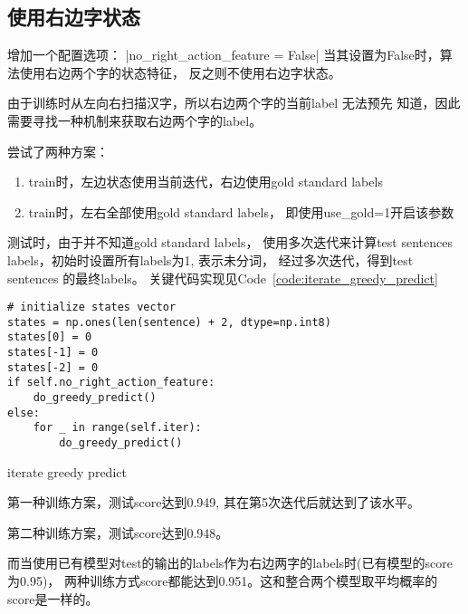 \documentclass[]{article}
\begin{document}
\pagebreak

\subsection{使用右边字状态}

增加一个配置选项：
|no_right_action_feature = False|
当其设置为False时，算法使用右边两个字的状态特征，
反之则不使用右边字状态。

由于训练时从左向右扫描汉字，所以右边两个字的当前label 无法预先
知道，因此需要寻找一种机制来获取右边两个字的label。

尝试了两种方案：
\begin{enumerate}
	\item train时，左边状态使用当前迭代，右边使用gold standard labels
	\item train时，左右全部使用gold standard labels，
	    即使用use\_gold=1开启该参数
\end{enumerate}

测试时，由于并不知道gold standard labels，
使用多次迭代来计算test sentences labels，初始时设置所有labels为1, 表示未分词，
经过多次迭代，得到test sentences 的最终labels。
关键代码实现见Code~\ref{code:iterate_greedy_predict}

\begin{listing}[H]
\begin{verbatim}
# initialize states vector
states = np.ones(len(sentence) + 2, dtype=np.int8)
states[0] = 0
states[-1] = 0
states[-2] = 0
if self.no_right_action_feature:
    do_greedy_predict()
else:
    for _ in range(self.iter):
        do_greedy_predict()
\end{verbatim}
\caption{iterate greedy predict}
\label{code:iterate_greedy_predict}
\end{listing}

第一种训练方案，测试score达到0.949, 其在第5次迭代后就达到了该水平。

第二种训练方案，测试score达到0.948。

而当使用已有模型对test的输出的labels作为右边两字的labels时(已有模型的score为0.95)，
两种训练方式score都能达到0.951。这和整合两个模型取平均概率的score是一样的。
\end{document}

